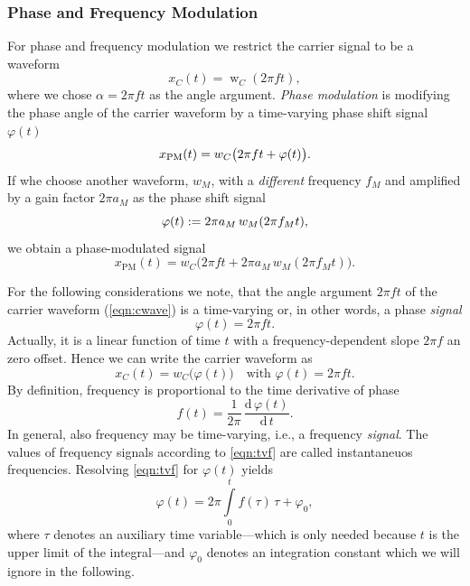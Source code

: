 \documentclass[a4paper]{article}
\def\d{\mathrm{d}}
\DeclareMathOperator{\wf}{w}
\begin{document}
\subsubsection{Phase and Frequency Modulation}
\label{sssec:FMPM}
For phase and frequency modulation we restrict the carrier signal to be a 
waveform
\begin{equation}
  \label{eqn:cwave}
  x_C(t) = \wf_C(2\pi ft),
\end{equation}
where we chose $\alpha=2\pi ft$ as the angle argument. \emph{Phase modulation}
is modifying the phase angle of the carrier waveform by a time-varying phase
shift signal $\varphi(t)$
\begin{equation}
  \notag
  x_\text{PM}(t)
  = w_C\big(2\pi ft + \varphi(t)\big).
\end{equation}
If whe choose another waveform, $w_M$, with a \emph{different} frequency $f_M$
and amplified by a gain factor $2\pi a_M$ as the phase shift signal
\begin{equation}
  \notag
  \varphi(t):=2\pi a_M\,w_M(2\pi f_Mt),
\end{equation}
we obtain a phase-modulated signal
\begin{equation}
  \label{eqn:PM}
  x_\text{PM}(t)
  = w_C\big(2\pi ft + 2\pi a_M\,w_M(2\pi f_M t)\big).
\end{equation}

For the following considerations we note, that the angle argument $2\pi f t$ of
the carrier waveform (\ref{eqn:cwave}) is a time-varying or, in other words, a
phase \emph{signal}
\begin{equation}
  \label{eqn:tvp}
  \varphi(t) = 2\pi f t.
\end{equation}
Actually, it is a linear function of time $t$ with a frequency-dependent slope 
$2\pi f$ an zero offset. Hence we can write the carrier waveform as
\begin{equation}
  \label{eqn:cwavep}
  x_C(t) = w_C\big(\varphi(t)\big)
  \quad\text{with } \varphi(t) = 2\pi f t.
\end{equation}
By definition, frequency is proportional to the time derivative of phase
\begin{equation}
  \label{eqn:tvf}
  f(t) = \frac{1}{2\pi}\,\frac{\d\,\varphi(t)}{\d\,t}.
\end{equation}
In general, also frequency may be time-varying, i.e., a frequency
\emph{signal}. The values of frequency signals according to \cref{eqn:tvf}
are called instantaneuos frequencies. Resolving \cref{eqn:tvf} for $\varphi(t)$
yields
\begin{equation}
  \varphi(t) = 2\pi\int\limits_0^t f(\tau)\,\tau + \varphi_0,
\end{equation} 
where $\tau$ denotes an auxiliary time variable---which is only needed because
$t$ is the upper limit of the integral---and $\varphi_0$ denotes an integration
constant which we will ignore in the following.
\end{document}
